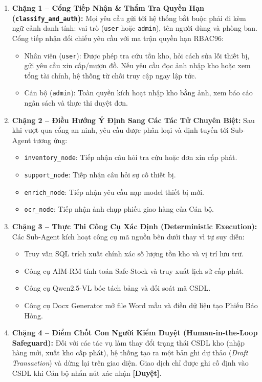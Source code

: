 \documentclass[11pt,a4paper]{article}
\begin{document}
\begin{enumerate}[leftmargin=1.8em]
    \item \textbf{Chặng 1 -- Cổng Tiếp Nhận \& Thẩm Tra Quyền Hạn (\texttt{classify\_and\_auth}):}
    Mọi yêu cầu gửi tới hệ thống bắt buộc phải đi kèm ngữ cảnh danh tính: vai trò (\texttt{user} hoặc \texttt{admin}), tên người dùng và phòng ban. Cổng tiếp nhận đối chiếu yêu cầu với ma trận quyền hạn RBAC96:
    \begin{itemize}[leftmargin=1.5em]
        \item Nhân viên (\texttt{user}): Được phép tra cứu tồn kho, hỏi cách sửa lỗi thiết bị, gửi yêu cầu xin cấp/mượn đồ. Nếu yêu cầu đọc ảnh nhập kho hoặc xem tổng tài chính, hệ thống từ chối truy cập ngay lập tức.
        \item Cán bộ (\texttt{admin}): Toàn quyền kích hoạt nhập kho bằng ảnh, xem báo cáo ngân sách và thực thi duyệt đơn.
    \end{itemize}

    \item \textbf{Chặng 2 -- Điều Hướng Ý Định Sang Các Tác Tử Chuyên Biệt:}
    Sau khi vượt qua cổng an ninh, yêu cầu được phân loại và định tuyến tới Sub-Agent tương ứng:
    \begin{itemize}[leftmargin=1.5em]
        \item \texttt{inventory\_node}: Tiếp nhận câu hỏi tra cứu hoặc đơn xin cấp phát.
        \item \texttt{support\_node}: Tiếp nhận câu hỏi sự cố thiết bị.
        \item \texttt{enrich\_node}: Tiếp nhận yêu cầu nạp model thiết bị mới.
        \item \texttt{ocr\_node}: Tiếp nhận ảnh chụp phiếu giao hàng của Cán bộ.
    \end{itemize}

    \item \textbf{Chặng 3 -- Thực Thi Công Cụ Xác Định (Deterministic Execution):}
    Các Sub-Agent kích hoạt công cụ mã nguồn bên dưới thay vì tự suy diễn:
    \begin{itemize}[leftmargin=1.5em]
        \item Truy vấn SQL trích xuất chính xác số lượng tồn kho và vị trí lưu trữ.
        \item Công cụ AIM-RM tính toán Safe-Stock và truy xuất lịch sử cấp phát.
        \item Công cụ Qwen2.5-VL bóc tách bảng và đối soát mã CSDL.
        \item Công cụ Docx Generator mở file Word mẫu và điền dữ liệu tạo Phiếu Báo Hỏng.
    \end{itemize}

    \item \textbf{Chặng 4 -- Điểm Chốt Con Người Kiểm Duyệt (Human-in-the-Loop Safeguard):}
    Đối với các tác vụ làm thay đổi trạng thái CSDL kho (nhập hàng mới, xuất kho cấp phát), hệ thống tạo ra một bản ghi dự thảo (\textit{Draft Transaction}) và dừng lại trên giao diện. Giao dịch chỉ được ghi cố định vào CSDL khi Cán bộ nhấn nút xác nhận \textbf{[Duyệt]}.
\end{enumerate}
\end{document}
